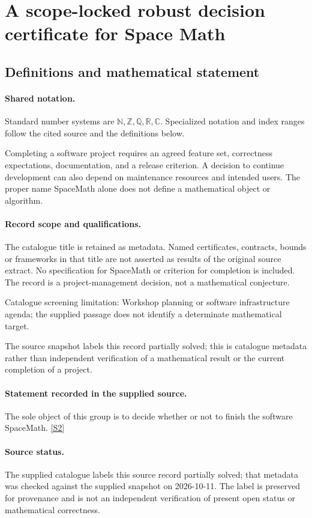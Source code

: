 \documentclass[11pt]{article}
\newcommand{\sref}[2]{\hyperlink{source:#1:#2}{[S#2]}}
\begin{document}
\section{A scope-locked robust decision certificate for Space Math}\label{statement}

\subsection{Definitions and mathematical statement}

\paragraph{Shared notation.}Standard number systems are $\mathbb N,\mathbb Z,\mathbb Q,\mathbb R,\mathbb C$. Specialized notation and index ranges follow the cited source and the definitions below.


Completing a software project requires an agreed feature set, correctness expectations, documentation, and a release criterion. A decision to continue development can also depend on maintenance resources and intended users. The proper name SpaceMath alone does not define a mathematical object or algorithm.
\paragraph{Record scope and qualifications.}
The catalogue title is retained as metadata. Named certificates, contracts, bounds or frameworks in that title are not asserted as results of the original source extract.
No specification for SpaceMath or criterion for completion is included. The record is a project-management decision, not a mathematical conjecture.

Catalogue screening limitation: Workshop planning or software infrastructure agenda; the supplied passage does not identify a determinate mathematical target.

The source snapshot labels this record partially solved; this is catalogue metadata rather than independent verification of a mathematical result or the current completion of a project.
\paragraph{Statement recorded in the supplied source.}
The sole object of this group is to decide whether or not to finish the software SpaceMath. \sref{statement}{2}
\paragraph{Source status.}
The supplied catalogue labels this source record partially solved; that metadata was checked against the supplied snapshot on 2026-10-11. The label is preserved for provenance and is not an independent verification of present open status or mathematical correctness.
\end{document}
